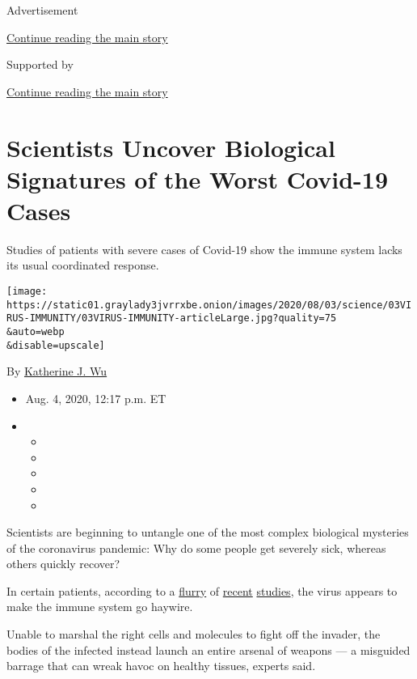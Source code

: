 Advertisement

\protect\hyperlink{after-top}{Continue reading the main story}

Supported by

\protect\hyperlink{after-sponsor}{Continue reading the main story}

\hypertarget{scientists-uncover-biological-signatures-of-the-worst-covid-19-cases}{%
\section{Scientists Uncover Biological Signatures of the Worst Covid-19
Cases}\label{scientists-uncover-biological-signatures-of-the-worst-covid-19-cases}}

Studies of patients with severe cases of Covid-19 show the immune system
lacks its usual coordinated response.

\texttt{[image: https://static01.graylady3jvrrxbe.onion/images/2020/08/03/science/03VIRUS-IMMUNITY/03VIRUS-IMMUNITY-articleLarge.jpg?quality=75\\\&auto=webp\\\&disable=upscale]}

By
\href{https://www.nytimes3xbfgragh.onion/by/katherine-j--wu}{Katherine
J. Wu}

\begin{itemize}
\item
  Aug. 4, 2020, 12:17 p.m. ET
\item
  \begin{itemize}
  \item
  \item
  \item
  \item
  \item
  \end{itemize}
\end{itemize}

Scientists are beginning to untangle one of the most complex biological
mysteries of the coronavirus pandemic: Why do some people get severely
sick, whereas others quickly recover?

In certain patients, according to a
\href{https://www.nature.com/articles/s41586-020-2588-y}{flurry} of
\href{https://science.sciencemag.org/content/early/2020/07/15/science.abc8511}{recent}
\href{https://immunology.sciencemag.org/content/5/49/eabd7114}{studies},
the virus appears to make the immune system go haywire.

Unable to marshal the right cells and molecules to fight off the
invader, the bodies of the infected instead launch an entire arsenal of
weapons --- a misguided barrage that can wreak havoc on healthy tissues,
experts said.

